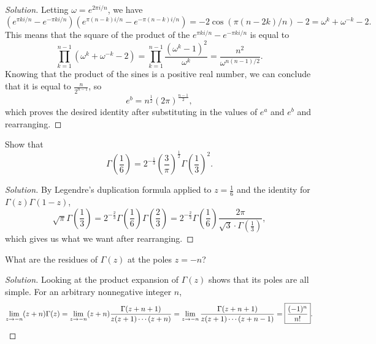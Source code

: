 \documentclass[10pt]{article}
\providecommand{\half}{\frac{1}{2}}
\newenvironment{soln}{\begin{proof}[Solution]}{\end{proof}}
\providecommand{\paren}[1]{\left(#1\right)}
\begin{document}
\begin{soln}
    Letting $\omega = e^{2\pi i/n}$, we have
    \begin{equation*}
	(e^{\pi k i/n} - e^{-\pi ki/n})
	(e^{\pi (n-k) i/n} - e^{-\pi (n-k)i/n})
	= -2\cos(\pi(n - 2k)/n) - 2
	= \omega^k + \omega^{-k} - 2.
    \end{equation*}
    This means that the square of the product of the
    $e^{\pi ki/n} - e^{-\pi ki/n}$ is equal to
    \begin{equation*}
	\prod_{k=1}^{n-1} (\omega^k + \omega^{-k} - 2)
	= \prod_{k=1}^{n-1} \frac{(\omega^k - 1)^2}{\omega^k}
	= \frac{n^2}{\omega^{n(n-1)/2}}.
    \end{equation*}
    Knowing that the product of the sines is a positive real number,
    we can conclude that it is equal to $\frac{n}{2^{n-1}}$, so
    \begin{equation*}
	e^b = n^{\half} (2\pi)^{\frac{n-1}2},
    \end{equation*}
    which proves the desired identity after substituting in
    the values of $e^a$ and $e^b$ and rearranging.
\end{soln}

\begin{problem}
    [p.200\#2]
    Show that
    \begin{equation*}
	\Gamma\paren{\frac 16} = 2^{-\frac 13}\paren{\frac 3\pi}^{\half}
	\Gamma\paren{\frac 13}^2.
    \end{equation*}
\end{problem}

\begin{soln}
    By Legendre's duplication formula applied to $z = \frac 16$
    and the identity for $\Gamma(z)\Gamma(1-z)$,
    \begin{equation*}
	\sqrt\pi\Gamma\paren{\frac 13}
	= 2^{-\frac 23}\Gamma\paren{\frac 16}\Gamma\paren{\frac 23}
	= 2^{-\frac 23}\Gamma\paren{\frac 16}
	\frac{2\pi}{\sqrt 3\cdot \Gamma(\frac 13)},
    \end{equation*}
    which gives us what we want after rearranging.
\end{soln}

\begin{problem}
    [p.200\#3]
    What are the residues of $\Gamma(z)$ at the poles $z = -n$?
\end{problem}

\begin{soln}
    Looking at the product expansion of $\Gamma(z)$
    shows that its poles are all simple.
    For an arbitrary nonnegative integer $n$,
    \begin{equation*}
	\lim_{z\to -n} (z+ n)\Gamma(z)
	= \lim_{z\to -n} (z + n)
	\frac{\Gamma(z + n + 1)}{z(z + 1)\cdots(z + n)}
	= \lim_{z\to -n} \frac{\Gamma(z + n + 1)}{z(z + 1)\cdots(z + n - 1)}
	= \boxed{\frac{(-1)^n}{n!}}.\qedhere
    \end{equation*}
\end{soln}
\end{document}
